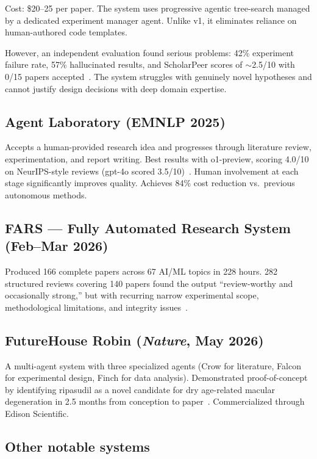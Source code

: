 \documentclass[11pt,a4paper]{article}
\begin{document}
Cost: \$20--25 per paper. The system uses progressive agentic tree-search managed by a dedicated experiment manager agent. Unlike v1, it eliminates reliance on human-authored code templates.

However, an independent evaluation found serious problems: 42\% experiment failure rate, 57\% hallucinated results, and ScholarPeer scores of $\sim$2.5/10 with 0/15 papers accepted~\cite{scholarpeer2026}. The system struggles with genuinely novel hypotheses and cannot justify design decisions with deep domain expertise.

\subsection{Agent Laboratory (EMNLP 2025)}

Accepts a human-provided research idea and progresses through literature review, experimentation, and report writing. Best results with o1-preview, scoring 4.0/10 on NeurIPS-style reviews (gpt-4o scored 3.5/10)~\cite{agentlab2025}. Human involvement at each stage significantly improves quality. Achieves 84\% cost reduction vs.\ previous autonomous methods.

\subsection{FARS --- Fully Automated Research System (Feb--Mar 2026)}

Produced 166 complete papers across 67 AI/ML topics in 228 hours. 282 structured reviews covering 140 papers found the output ``review-worthy and occasionally strong,'' but with recurring narrow experimental scope, methodological limitations, and integrity issues~\cite{fars2026}.

\subsection{FutureHouse Robin (\emph{Nature}, May 2026)}

A multi-agent system with three specialized agents (Crow for literature, Falcon for experimental design, Finch for data analysis). Demonstrated proof-of-concept by identifying ripasudil as a novel candidate for dry age-related macular degeneration in 2.5 months from conception to paper~\cite{futurehouse2026}. Commercialized through Edison Scientific.

\subsection{Other notable systems}
\end{document}
